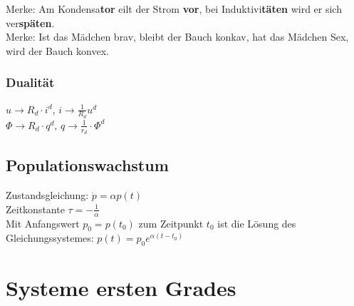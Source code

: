 \documentclass[fs, footer]{latex4ei}
\begin{document}
\begin{multicols*}{4}
    Merke: Am Kondensa\textbf{tor} eilt der Strom \textbf{vor}, bei Induktivi\textbf{täten} wird er sich ver\textbf{späten}.\\
    Merke: Ist das Mädchen brav, bleibt der Bauch konkav, hat das Mädchen Sex, wird der Bauch konvex.\\

    \subsubsection{Dualität}
    $u\rightarrow R_d\cdot i^d$, $i\rightarrow \frac{1}{R_d}u^d$\\
    $\Phi\rightarrow R_d\cdot q^d$, $q\rightarrow \frac{1}{r_d}\cdot\Phi^d$


    \subsection{Populationswachstum}
    
    Zustandsgleichung: $\dot{p}=\alpha{}p(t)$\\
    Zeitkonstante $\tau = -\frac{1}{\alpha}$\\
    Mit Anfangswert $p_0=p(t_0)$ zum Zeitpunkt $t_0$ ist die Lösung des Gleichungssystemes: $p(t)=p_0 e^{\alpha{}(t-t_0)}$\\

    \section{Systeme ersten Grades}
\end{multicols*}
\end{document}
